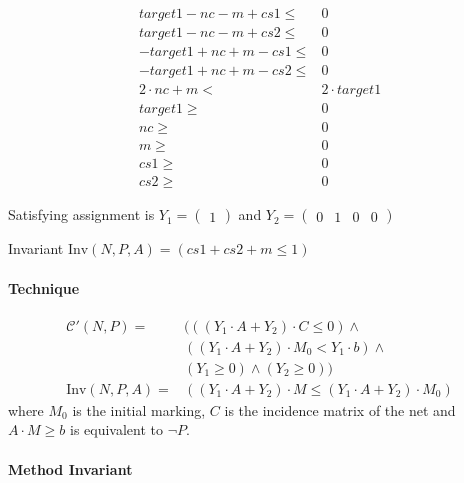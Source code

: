 \documentclass{article}
\begin{document}
\begin{align*}
  target1 - nc - m + cs1 \le& 0 \\ 
  target1 - nc - m + cs2 \le& 0 \\ 
  - target1 + nc + m - cs1 \le& 0 \\ 
  - target1 + nc + m - cs2 \le& 0 \\ 
2 \cdot nc + m <& 2 \cdot target1 \\
  target1 \ge& 0 \\
  nc \ge& 0 \\
  m \ge& 0 \\
  cs1 \ge& 0 \\
  cs2 \ge& 0
\end{align*}

Satisfying assignment is $Y_1 = \begin{pmatrix} 1 \end{pmatrix}$ and
$Y_2 = \begin{pmatrix}0 & 1 & 0 & 0 \end{pmatrix}$

Invariant $\text{Inv}(N, P, A) = (cs1 + cs2 + m \le 1)$

\paragraph{Technique}
\begin{align*}
  \mathcal C'(N, P) =& ( ( ( Y_1 \cdot A + Y_2) \cdot C \le 0) \land \\
& ((Y_1 \cdot A + Y_2) \cdot M_0 < Y_1 \cdot b) \land \\
& (Y_1 \ge 0) \land (Y_2 \ge 0)) \\
  \text{Inv}(N, P, A) =& ( ( Y_1 \cdot A + Y_2) \cdot M \le ( Y_1 \cdot A + Y_2) \cdot M_0)
\end{align*}
where $M_0$ is the initial marking, $C$ is the incidence matrix of the net and
$A\cdot M \ge b$ is equivalent to $\neg P$.

\paragraph{Method Invariant}
\mbox{ } \\
\end{document}
